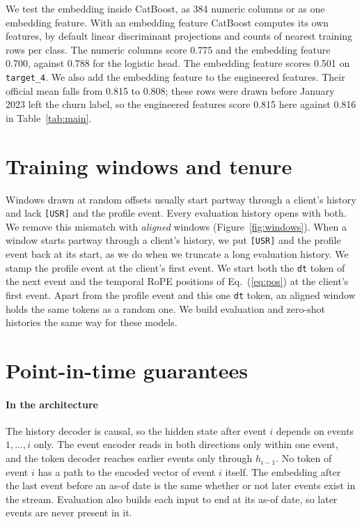 \documentclass[12pt]{article}
\newcommand{\tok}[1]{\texttt{#1}}
\begin{document}
We test the embedding inside CatBoost, as 384 numeric columns or as one embedding feature. With an embedding feature CatBoost computes its own features, by default linear discriminant projections and counts of nearest training rows per class. The numeric columns score 0.775 and the embedding feature 0.700, against 0.788 for the logistic head. The embedding feature scores 0.501 on \tok{target\_4}. We also add the embedding feature to the engineered features. Their official mean falls from 0.815 to 0.808; these rows were drawn before January 2023 left the churn label, so the engineered features score 0.815 here against 0.816 in Table~\ref{tab:main}.

\section{Training windows and tenure}\label{sec:windows}

Windows drawn at random offsets usually start partway through a client's history and lack \tok{[USR]} and the profile event. Every evaluation history opens with both. We remove this mismatch with \emph{aligned} windows (Figure~\ref{fig:windows}). When a window starts partway through a client's history, we put \tok{[USR]} and the profile event back at its start, as we do when we truncate a long evaluation history. We stamp the profile event at the client's first event. We start both the \tok{dt} token of the next event and the temporal RoPE positions of Eq.~(\ref{eq:pos}) at the client's first event. Apart from the profile event and this one \tok{dt} token, an aligned window holds the same tokens as a random one. We build evaluation and zero-shot histories the same way for these models.

\section{Point-in-time guarantees}\label{app:pit}

\paragraph{In the architecture} The history decoder is causal, so the hidden state after event $i$ depends on events $1, \dots, i$ only. The event encoder reads in both directions only within one event, and the token decoder reaches earlier events only through $h_{i-1}$. No token of event $i$ has a path to the encoded vector of event $i$ itself. The embedding after the last event before an as-of date is the same whether or not later events exist in the stream. Evaluation also builds each input to end at its as-of date, so later events are never present in it.
\end{document}
